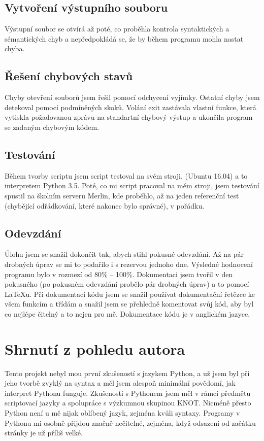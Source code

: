 \documentclass[a4paper, 10pt]{article}
\begin{document}
        \subsection{Vytvoření výstupního souboru}
            Výstupní soubor se otvírá až poté, co proběhla kontrola syntaktických
            a sémantických chyb a nepředpokládá se, že by během programu mohla nastat
            chyba.
        \subsection{Řešení chybových stavů}
            Chyby otevření souborů jsem řešil pomocí odchycení vyjímky. Ostatní
            chyby jsem detekoval pomocí podmíněných skoků. Volání exit zastávala
            vlastní funkce, která vytiskla požadovanou zprávu na standartní chybový výstup
            a ukončila program se zadaným chybovým kódem.
        \subsection{Testování}
            Během tvorby scriptu jsem script testoval na svém stroji, (Ubuntu 16.04)
            a to interpretem Python 3.5. Poté, co mi script pracoval na mém stroji,
            jsem testování spustil na školním serveru Merlin, kde proběhlo, až na
            jeden referenční test (chybějící odřádkování, které nakonec bylo správné),
            v pořádku.
        \subsection{Odevzdání}
            Úlohu jsem se snažil dokončit tak, abych stihl pokusné odevzdání.
            Až na pár drobných úprav se mi to podařilo i s rezervou jednoho dne.
            Výsledné hodnocení programu bylo v rozmezí od 80\% -- 100\%.
            Dokumentaci jsem tvořil v den pokusného (po pokusném odevzdání
            probělo pár drobných úprav) a to pomocí \LaTeX u. Při dokumentaci
            kódu jsem se snažil používat dokumentační řetězce ke všem funkcím a
            třídám a snažil jsem se přehledně komentovat svůj kód, aby byl co
            nejlépe čitelný a to nejen pro mě. Dokumentace kódu je v anglickém
            jazyce.

    \section{Shrnutí z pohledu autora}
        Tento projekt nebyl mou první zkušeností s jazykem Python, a už jsem byl
        při jeho tvorbě zvyklý na syntax a měl jsem alespoň minimální povědomí, jak
        interpret Pythonu funguje. Zkušenosti s Pythonem jsem měl v rámci předmětu
        scriptovací jazyky a spolupráce s výzkumnou skupinou KNOT. Nicméně přesto
        Python není u mě nijak oblíbený jazyk, zejména kvůli syntaxy. Programy v
        Pythonu mi osobně přijdou značně nečitelné, zejména, když odsazení
        od začátku stránky je už příliš velké.
\end{document}
